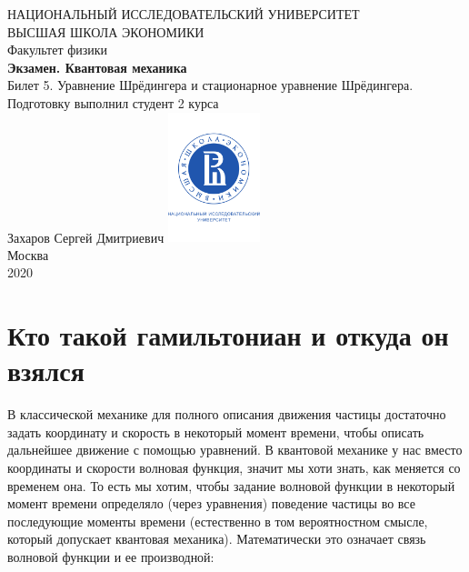 \documentclass[a4paper, 12pt]{article}
\begin{document}
	\begin{titlepage}
		\begin{center}
			$$$$
			$$$$
			$$$$
			$$$$
			{\Large{НАЦИОНАЛЬНЫЙ ИССЛЕДОВАТЕЛЬСКИЙ УНИВЕРСИТЕТ}}\\
			\vspace{0.1cm}
			{\Large{ВЫСШАЯ ШКОЛА ЭКОНОМИКИ}}\\
			\vspace{0.25cm}
			{\large{Факультет физики}}\\
			\vspace{5.5cm}
			{\Huge\textbf{{Экзамен. Квантовая механика}}}\\%
			\vspace{1cm}
			{\LARGE{Билет 5. Уравнение Шрёдингера и стационарное уравнение Шрёдингера.}}\\%
			\vspace{2cm}
			{Подготовку выполнил студент 2 курса}\\
			{Захаров Сергей Дмитриевич}
			\vfill
			\includegraphics[width = 0.2\textwidth]{HSElogo}\\
			\vfill
			Москва\\
			2020
		\end{center}
	\end{titlepage}

\section{Кто такой гамильтониан и откуда он взялся}

В классической механике для полного описания движения частицы достаточно задать координату и скорость в некоторый момент времени, чтобы описать дальнейшее движение с помощью уравнений. В квантовой механике у нас вместо координаты и скорости волновая функция, значит мы хоти знать, как меняется со временем она. То есть мы хотим, чтобы задание волновой функции в некоторый момент времени определяло (через уравнения) поведение частицы во все последующие моменты времени (естественно в том вероятностном смысле, который допускает квантовая механика). Математически это означает связь волновой функции и ее производной:
\end{document}
